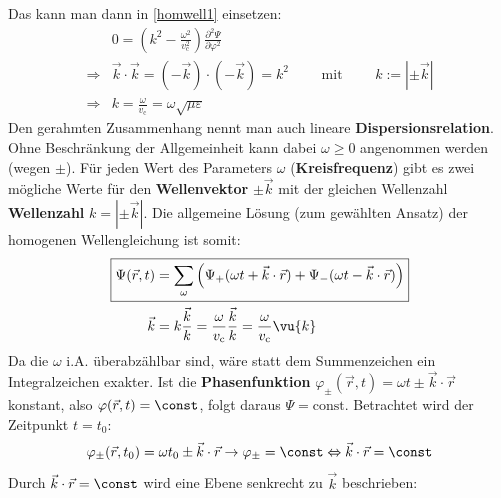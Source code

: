	Das kann man dann in \ref{homwell1} einsetzen:
		\begin{equation}\begin{split}
				         &0 = \left(  k^2 -\frac{\omega^2}{  v_\mathrm{c}^2}\right)\frac{\partial^2 \Psi}{\partial \varphi^2}\\
				         \Rightarrow &\vec{k}\cdot\vec{k}= \left(-\vec{k}\right)\cdot \left(-\vec{k}\right) =  k^2  \quad \quad \text{ mit }\quad \quad k:=|\pm\vec{k}|\\
				         \Rightarrow & \boxed{k= \frac{\omega}{v_\mathrm{c}}=\omega \sqrt{\mu\varepsilon} }
			        \end{split}\end{equation}
		      Den gerahmten Zusammenhang nennt man auch lineare \textbf{Dispersionsrelation}. Ohne Beschränkung der Allgemeinheit kann dabei $\omega\geq 0$ angenommen werden (wegen $\pm$). Für jeden Wert des Parameters \(\omega\) (\textbf{Kreisfrequenz}) gibt es zwei mögliche Werte für den \textbf{Wellenvektor} $\pm \vec{k}$ mit der gleichen Wellenzahl \textbf{Wellenzahl} \( k = |\pm\vec{k}|\). Die allgemeine Lösung (zum gewählten Ansatz) der homogenen Wellengleichung ist somit:
		        \begin{equation}\label{algebwell}\begin{split}
			        \Aboxed{ \Psi (\vec{r} , t) &= \sum_\omega \left( \Psi_+ (\omega t + \vec{k}\cdot\vec{r} ) + \Psi_- (\omega t - \vec{k}\cdot\vec{r} ) \right) }     \\ \vec{k} &=  k \frac{\vec{k}}{ k} = \frac{\omega}{ v_\mathrm{c}}\frac{\vec{k}}{ k} =\frac{\omega}{ v_\mathrm{c}} \vu{ k}
		       \end{split} \end{equation}
		  Da die $\omega$ i.A. überabzählbar sind, wäre statt dem Summenzeichen ein Integralzeichen exakter. Ist die \textbf{Phasenfunktion} \(\varphi_\pm (\vec{r} , t) = \omega t \pm \vec{k}\cdot\vec{r}  \) konstant, also \( \varphi (\vec{r} , t) = \const \), folgt daraus \( \Psi = \text{const}\). Betrachtet wird der Zeitpunkt \(t=t_0\):
		        \begin{equation}
			        \varphi_\pm (\vec{r} , t_0) = \omega t_0 \pm \vec{k}\cdot\vec{r}  \to \varphi_\pm=\const \Leftrightarrow  \vec{k}\cdot\vec{r} =\const
		        \end{equation}
		   Durch $\vec{k}\cdot\vec{r}=\const$ wird eine Ebene senkrecht zu $\vec{k}$ beschrieben:
	  \begin{center}
		  \resizebox{.5\textwidth}{!}{}
	  \end{center}
